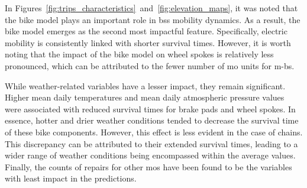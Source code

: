     In Figures~\ref{fig:trips_characteristics}~and~\ref{fig:elevation_maps}, it was noted that the bike model plays an important role in \ac{bss} mobility dynamics. As a result, the bike model emerges as the second most impactful feature. Specifically, electric mobility is consistently linked with shorter survival times. However, it is worth noting that the impact of the bike model on wheel spokes is relatively less pronounced, which can be attributed to the fewer number of \ac{mo} units for \acp{m-b}.

    While weather-related variables have a lesser impact, they remain significant. Higher mean daily temperatures and mean daily atmospheric pressure values were associated with reduced survival times for brake pads and wheel spokes. In essence, hotter and drier weather conditions tended to decrease the survival time of these bike components. However, this effect is less evident in the case of chains. This discrepancy can be attributed to their extended survival times, leading to a wider range of weather conditions being encompassed within the average values. Finally, the counts of repairs for other \acp{mo} have been found to be the variables with least impact in the predictions.
        